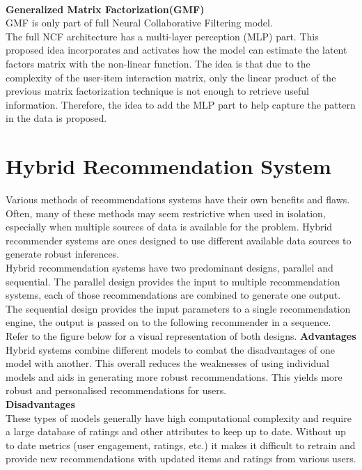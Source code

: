 \\\textbf{Generalized Matrix Factorization(GMF)}
 \\GMF is only part of full Neural Collaborative Filtering model.
 \\The full NCF architecture has a multi-layer perception (MLP) part. This proposed idea incorporates and activates how the model can estimate the latent factors matrix with the non-linear function. The idea is that due to the complexity of the user-item interaction matrix, only the linear product of the previous matrix factorization technique is not enough to retrieve useful information. Therefore, the idea to add the MLP part to help capture the pattern in the data is proposed.


\section{Hybrid Recommendation System}
Various methods of recommendations systems have their own benefits and flaws. Often, many of these methods may seem restrictive when used in isolation, especially when multiple sources of data is available for the problem. Hybrid recommender systems are ones designed to use different available data sources to generate robust inferences.
\\Hybrid recommendation systems have two predominant designs, parallel and sequential. The parallel design provides the input to multiple recommendation systems, each of those recommendations are combined to generate one output. 
The sequential design provides the input parameters to a single recommendation engine, the output is passed on to the following recommender in a sequence. Refer to the figure below for a visual representation of both designs.
\textbf{Advantages}
\\Hybrid systems combine different models to combat the disadvantages of one model with another. This overall reduces the weaknesses of using individual models and aids in generating more robust recommendations. This yields more robust and personalised recommendations for users.
\\\textbf{Disadvantages}
\\These types of models generally have high computational complexity and require a large database of ratings and other attributes to keep up to date. 
Without up to date metrics (user engagement, ratings, etc.) it makes it difficult to retrain and provide new recommendations with updated items and ratings from various users.

